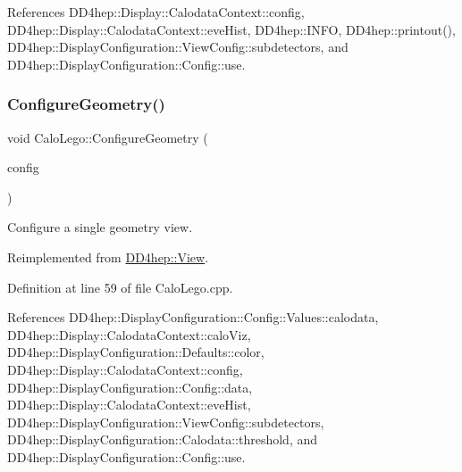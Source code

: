 References D\+D4hep\+::\+Display\+::\+Calodata\+Context\+::config, D\+D4hep\+::\+Display\+::\+Calodata\+Context\+::eve\+Hist, D\+D4hep\+::\+I\+N\+FO, D\+D4hep\+::printout(), D\+D4hep\+::\+Display\+Configuration\+::\+View\+Config\+::subdetectors, and D\+D4hep\+::\+Display\+Configuration\+::\+Config\+::use.

\hypertarget{class_d_d4hep_1_1_calo_lego_aca92ae6d2fe4e24a928fa23dbe755d19}{}\label{class_d_d4hep_1_1_calo_lego_aca92ae6d2fe4e24a928fa23dbe755d19} 
\subsubsection{\texorpdfstring{Configure\+Geometry()}{ConfigureGeometry()}}
{\footnotesize\ttfamily void Calo\+Lego\+::\+Configure\+Geometry (\begin{DoxyParamCaption}\item[{const \hyperlink{class_d_d4hep_1_1_display_configuration_1_1_view_config}{Display\+Configuration\+::\+View\+Config} \&}]{config }\end{DoxyParamCaption})\hspace{0.3cm}{\ttfamily [virtual]}}



Configure a single geometry view. 



Reimplemented from \hyperlink{class_d_d4hep_1_1_view_adefb4cb817819ec62803d34b89bf0988}{D\+D4hep\+::\+View}.



Definition at line 59 of file Calo\+Lego.\+cpp.



References D\+D4hep\+::\+Display\+Configuration\+::\+Config\+::\+Values\+::calodata, D\+D4hep\+::\+Display\+::\+Calodata\+Context\+::calo\+Viz, D\+D4hep\+::\+Display\+Configuration\+::\+Defaults\+::color, D\+D4hep\+::\+Display\+::\+Calodata\+Context\+::config, D\+D4hep\+::\+Display\+Configuration\+::\+Config\+::data, D\+D4hep\+::\+Display\+::\+Calodata\+Context\+::eve\+Hist, D\+D4hep\+::\+Display\+Configuration\+::\+View\+Config\+::subdetectors, D\+D4hep\+::\+Display\+Configuration\+::\+Calodata\+::threshold, and D\+D4hep\+::\+Display\+Configuration\+::\+Config\+::use.

\hypertarget{class_d_d4hep_1_1_calo_lego_a0d62d7d45cb1935651cbc9fc2d37af57}{}\label{class_d_d4hep_1_1_calo_lego_a0d62d7d45cb1935651cbc9fc2d37af57} 
